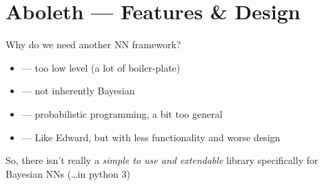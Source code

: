 \documentclass[lualatex, aspectratio=169]{beamer}
\begin{document}
\section{Aboleth --- Features \& Design}


\begin{frame}{Why do we need another NN framework?}

  \begin{itemize}
    \item {} --- too low level (a lot of boiler-plate)
    \item {} --- not inherently Bayesian
    \item {} --- probabilistic programming, a bit too general
    \item {} --- Like Edward, but with less functionality and worse design
  \end{itemize}

  \hspace{1cm}

  So, there isn't really a \emph{simple to use and extendable} library specifically for Bayesian NNs (\ldots in python 3)

\end{frame}
\end{document}
